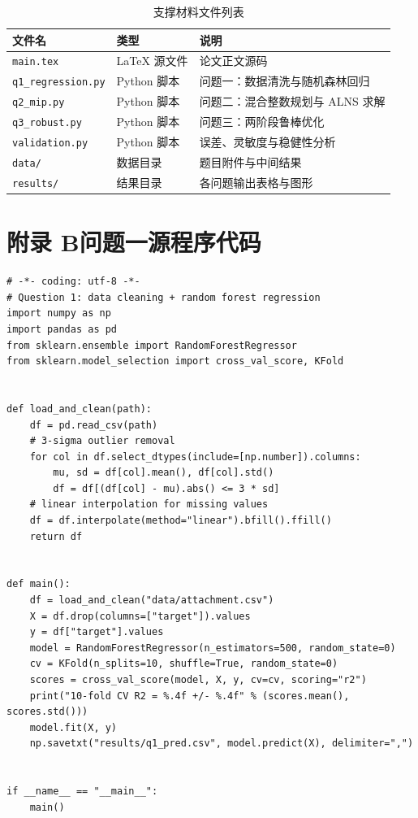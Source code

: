 \documentclass[12pt,a4paper]{ctexart}
\begin{document}
\begin{table}[htbp]
  \centering
  \caption{支撑材料文件列表}
  \label{tab:files}
  \begin{tabular}{lll}
    \toprule
    \textbf{文件名} & \textbf{类型} & \textbf{说明} \\
    \midrule
    \texttt{main.tex}          & LaTeX 源文件 & 论文正文源码 \\
    \texttt{q1\_regression.py} & Python 脚本  & 问题一：数据清洗与随机森林回归 \\
    \texttt{q2\_mip.py}        & Python 脚本  & 问题二：混合整数规划与 ALNS 求解 \\
    \texttt{q3\_robust.py}     & Python 脚本  & 问题三：两阶段鲁棒优化 \\
    \texttt{validation.py}     & Python 脚本  & 误差、灵敏度与稳健性分析 \\
    \texttt{data/}             & 数据目录     & 题目附件与中间结果 \\
    \texttt{results/}          & 结果目录     & 各问题输出表格与图形 \\
    \bottomrule
  \end{tabular}
\end{table}

\section*{附录 B\quad 问题一源程序代码}
\label{app:code1}

\begin{lstlisting}[style=python,caption={问题一：数据清洗与随机森林回归},label={lst:q1}]
# -*- coding: utf-8 -*-
# Question 1: data cleaning + random forest regression
import numpy as np
import pandas as pd
from sklearn.ensemble import RandomForestRegressor
from sklearn.model_selection import cross_val_score, KFold


def load_and_clean(path):
    df = pd.read_csv(path)
    # 3-sigma outlier removal
    for col in df.select_dtypes(include=[np.number]).columns:
        mu, sd = df[col].mean(), df[col].std()
        df = df[(df[col] - mu).abs() <= 3 * sd]
    # linear interpolation for missing values
    df = df.interpolate(method="linear").bfill().ffill()
    return df


def main():
    df = load_and_clean("data/attachment.csv")
    X = df.drop(columns=["target"]).values
    y = df["target"].values
    model = RandomForestRegressor(n_estimators=500, random_state=0)
    cv = KFold(n_splits=10, shuffle=True, random_state=0)
    scores = cross_val_score(model, X, y, cv=cv, scoring="r2")
    print("10-fold CV R2 = %.4f +/- %.4f" % (scores.mean(), scores.std()))
    model.fit(X, y)
    np.savetxt("results/q1_pred.csv", model.predict(X), delimiter=",")


if __name__ == "__main__":
    main()
\end{lstlisting}
\end{document}
